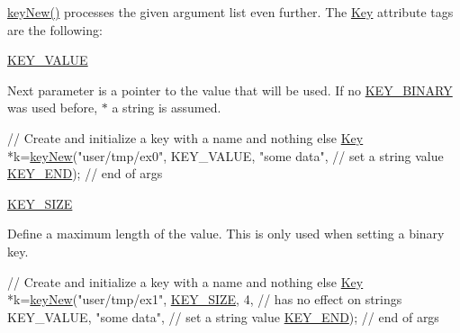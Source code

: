 \hyperlink{group__key_gad23c65b44bf48d773759e1f9a4d43b89}{key\-New()} processes the given argument list even further. The \hyperlink{classkdb_1_1Key}{Key} attribute tags are the following\-:
\begin{DoxyItemize}
\item \hyperlink{group__key_gga91fb3178848bd682000958089abbaf40ac66e4a49d09212b79f5754ca6db5bd2e}{K\-E\-Y\-\_\-\-V\-A\-L\-U\-E} \par
 Next parameter is a pointer to the value that will be used. If no \hyperlink{group__key_gga91fb3178848bd682000958089abbaf40a1ca18d4e094ae7487d35ecedda2235ff}{K\-E\-Y\-\_\-\-B\-I\-N\-A\-R\-Y} was used before, $\ast$ a string is assumed. 
\begin{DoxyCodeInclude}
\textcolor{comment}{// Create and initialize a key with a name and nothing else}
\hyperlink{classkdb_1_1Key_a5679f5cae63caddd64a60388b9cc77fa}{Key} *k=\hyperlink{group__key_gad23c65b44bf48d773759e1f9a4d43b89}{keyNew}(\textcolor{stringliteral}{"user/tmp/ex0"},
        KEY\_VALUE, \textcolor{stringliteral}{"some data"},    \textcolor{comment}{// set a string value}
        \hyperlink{group__key_gga91fb3178848bd682000958089abbaf40aa8adb6fcb92dec58fb19410eacfdd403}{KEY\_END});                  \textcolor{comment}{// end of args}
\end{DoxyCodeInclude}

\item \hyperlink{group__key_gga91fb3178848bd682000958089abbaf40a6d531b5c41445d19d0452eebdccbfa01}{K\-E\-Y\-\_\-\-S\-I\-Z\-E} \par
 Define a maximum length of the value. This is only used when setting a binary key. 
\begin{DoxyCodeInclude}
\textcolor{comment}{// Create and initialize a key with a name and nothing else}
\hyperlink{classkdb_1_1Key_a5679f5cae63caddd64a60388b9cc77fa}{Key} *k=\hyperlink{group__key_gad23c65b44bf48d773759e1f9a4d43b89}{keyNew}(\textcolor{stringliteral}{"user/tmp/ex1"},
        \hyperlink{group__key_gga91fb3178848bd682000958089abbaf40a6d531b5c41445d19d0452eebdccbfa01}{KEY\_SIZE}, 4,               \textcolor{comment}{// has no effect on strings}
        KEY\_VALUE, \textcolor{stringliteral}{"some data"},    \textcolor{comment}{// set a string value}
        \hyperlink{group__key_gga91fb3178848bd682000958089abbaf40aa8adb6fcb92dec58fb19410eacfdd403}{KEY\_END});                  \textcolor{comment}{// end of args}
\end{DoxyCodeInclude}


\end{DoxyItemize}
